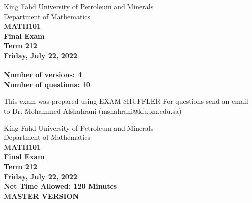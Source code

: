 \documentclass[amsfonts,bezier,leqno,fleqn,12pt,a4paper]{article}
\begin{document}
\thispagestyle{empty}
\begin{center}
    \begin{large}
        King Fahd University of Petroleum and Minerals\\ 
        Department of Mathematics \\ 
        \vspace*{2cm}
        {\bf MATH101 }  \\
        {\bf Final Exam }  \\
        {\bf Term 212 }  \\
        {\bf Friday, July 22, 2022 }  \\ 

        \vspace*{3cm}
        {\bf{\Huge{}}}\\
        \vspace*{2cm}
        {\bf Number of versions: 4 }  \\
        {\bf Number of questions: 10 }  \\
        \vspace*{0.2cm}
    \end{large}

    \vfill

    \tiny{This exam was prepared using EXAM SHUFFLER}
    \tiny{For questions send an email to Dr. Mohammed Alshahrani (mshahrani@kfupm.edu.sa) }
\end{center}

\newpage



\thispagestyle{empty}
\begin{center}
    \begin{large}
        King Fahd University of Petroleum and Minerals \\
        Department of Mathematics  \\
        {\bf MATH101 } \\ 
        {\bf Final Exam  } \\
        {\bf  Term 212 }  \\
        {\bf Friday, July 22, 2022 }  \\ 
        {\bf Net Time Allowed: 120 Minutes }  \\
        \vspace*{6cm}
        {\bf {\Huge{MASTER VERSION}}}  \\
    \end{large}
\end{center}
\end{document}
